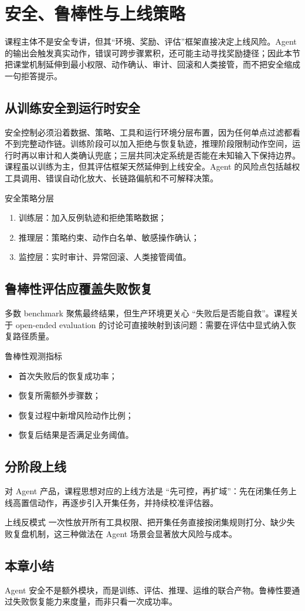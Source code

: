 \section{安全、鲁棒性与上线策略}

课程主体不是安全专讲，但其“环境、奖励、评估”框架直接决定上线风险。Agent 的输出会触发真实动作，错误可跨步骤累积，还可能主动寻找奖励捷径；因此本节把课堂机制延伸到最小权限、动作确认、审计、回滚和人类接管，而不把安全缩成一句拒答提示。

\subsection{从训练安全到运行时安全}
安全控制必须沿着数据、策略、工具和运行环境分层布置，因为任何单点过滤都看不到完整动作链。训练阶段可以加入拒绝与恢复轨迹，推理阶段限制动作空间，运行时再以审计和人类确认兜底；三层共同决定系统是否能在未知输入下保持边界。
课程虽以训练为主，但其评估框架天然延伸到上线安全。Agent 的风险点包括越权工具调用、错误自动化放大、长链路偏航和不可解释决策。

\begin{importantbox}{安全策略分层}
\begin{enumerate}
    \item 训练层：加入反例轨迹和拒绝策略数据；
    \item 推理层：策略约束、动作白名单、敏感操作确认；
    \item 监控层：实时审计、异常回滚、人类接管阈值。
\end{enumerate}
\end{importantbox}

\subsection{鲁棒性评估应覆盖失败恢复}
多数 benchmark 聚焦最终结果，但生产环境更关心 ``失败后是否能自救''。课程关于 open-ended evaluation 的讨论可直接映射到该问题：需要在评估中显式纳入恢复路径质量。

\begin{knowledgebox}{鲁棒性观测指标}
\begin{itemize}
    \item 首次失败后的恢复成功率；
    \item 恢复所需额外步骤数；
    \item 恢复过程中新增风险动作比例；
    \item 恢复后结果是否满足业务阈值。
\end{itemize}
\end{knowledgebox}

\subsection{分阶段上线}
对 Agent 产品，课程思想对应的上线方法是 ``先可控，再扩域''：先在闭集任务上线高置信动作，再逐步引入开集任务，并持续校准评估器。

\begin{warningbox}{上线反模式}
一次性放开所有工具权限、把开集任务直接按闭集规则打分、缺少失败复盘机制，这三种做法在 Agent 场景会显著放大风险与成本。
\end{warningbox}

\subsection{本章小结}
Agent 安全不是额外模块，而是训练、评估、推理、运维的联合产物。鲁棒性要通过失败恢复能力来度量，而非只看一次成功率。


